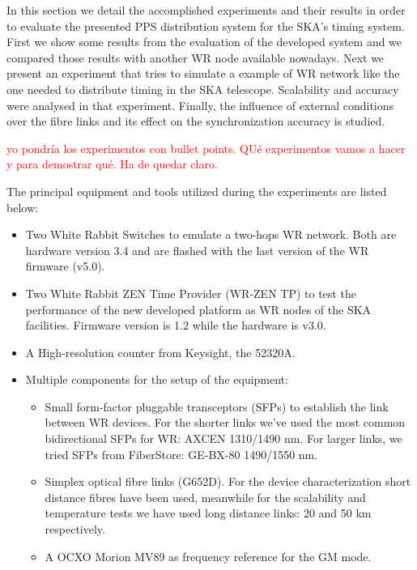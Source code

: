 
In this section we detail the accomplished experiments and their results in 
order to evaluate the presented PPS distribution system for the SKA's timing 
system. First we show some results from the evaluation of the developed system and we compared those results with another WR node available nowadays. Next we present an experiment that tries to simulate a example of WR network like the 
one needed to distribute timing in the SKA telescope. Scalability and accuracy were analysed in that experiment. Finally, the influence of external conditions over the fibre links and its effect on the synchronization accuracy is studied.

\textcolor{red}{yo pondría los experimentos con bullet points. QUé experimentos vamos a hacer y para demostrar qué. Ha de quedar claro.}


The principal equipment and tools utilized during the experiments are listed 
below:

\begin{itemize}
    \item Two White Rabbit Switches to emulate a two-hops WR network. Both are 
    hardware version 3.4 and are flashed with the last version of the WR 
    firmware (v5.0).
    
    \item Two White Rabbit ZEN Time Provider (WR-ZEN TP) to test the 
    performance of the new developed platform as WR nodes of the SKA 
    facilities. Firmware version is 1.2 while the hardware is v3.0.
    
    \item A High-resolution counter from Keysight, the 52320A.
    
    \item Multiple components for the setup of the equipment:
    \begin{itemize}
        \item Small form-factor pluggable transceptors (SFPs) to establish the 
        link between WR devices. For the shorter links we've used the most 
        common bidirectional SFPs for WR: AXCEN 1310/1490 nm. For larger links, 
        we tried 
        SFPs from FiberStore: GE-BX-80 1490/1550 nm.
        \item Simplex optical fibre links (G652D). For the device 
        characterization short distance fibres have been used, meanwhile for 
        the scalability and temperature tests we have used long distance links: 
        20 and 50 km respectively.
        \item A OCXO Morion MV89 as frequency reference for the GM mode.
    \end{itemize}
    
\end{itemize}

